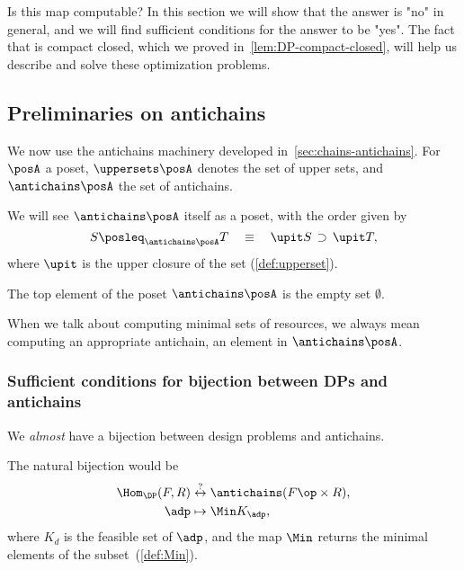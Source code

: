 Is this map computable? In this section we will show that the answer is "no" in general, and we will find sufficient conditions for the answer to be "yes". The fact that \DP is compact closed, which we proved in~\cref{lem:DP-compact-closed}, will help us describe and solve these optimization problems.

\subsection{Preliminaries on antichains}

We now use the antichains machinery developed in~\cref{sec:chains-antichains}. For $\posA$ a poset, $\uppersets \posA$ denotes the set of upper sets, and $\antichains \posA$ the set of antichains.


We will see $\antichains \posA$ itself as a poset, with the order given by
\begin{equation*}
    S \posleq_{\antichains \posA} T  \quad \equiv \quad\upit S\, \supset\,\upit T,
\end{equation*}
where $\upit$ is the upper closure of the set (\cref{def:upperset}).

The top element of the poset $\antichains\posA$ is the empty set $\emptyset$.

When we talk about computing minimal sets of resources, we always mean computing an appropriate antichain, \ie an element in $\antichains \posA$.

\subsubsection{Sufficient conditions for bijection between DPs and antichains}

We \emph{almost} have a bijection between design problems and antichains.

The natural bijection would be
\begin{equation}
    \begin{aligned}
        \Hom_\DP(F,R) &\overset{?}{\leftrightarrow} \antichains (F\op \times R), \\
        \adp &\mapsto \Min K_\adp,
    \end{aligned}
\end{equation}
where $K_d$ is the feasible set of $\adp$,
and the map $\Min$ returns the minimal elements of the subset~(\cref{def:Min}).

